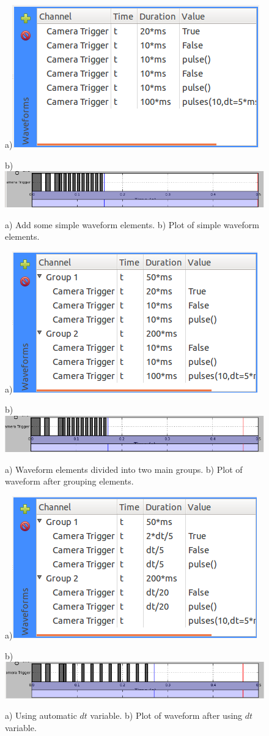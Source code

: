 \begin{enumerate}
\begin{enumerate}
        \begin{figure}[ht]
          \centerline{a)\includegraphics[width=.5\textwidth]{figures/waveform-4}}
          \centerline{b)\includegraphics[width=.8\textwidth]{figures/plot-4}}
          \caption{a) Add some simple waveform elements. b) Plot of simple
          waveform elements.}
          \label{fig:quick:waveform-4}
        \end{figure}

        \begin{figure}[ht]
          \centerline{a)\includegraphics[width=.5\textwidth]{figures/waveform-5}}
          \centerline{b)\includegraphics[width=.8\textwidth]{figures/plot-5}}
          \caption{a) Waveform elements divided into two main groups. b) Plot of
          waveform after grouping elements.}
          \label{fig:quick:waveform-5}
        \end{figure}

        \begin{figure}[ht]
          \centerline{a)\includegraphics[width=.5\textwidth]{figures/waveform-6}}
          \centerline{b)\includegraphics[width=.8\textwidth]{figures/plot-6}}
          \caption{a) Using automatic $dt$ variable. b) Plot of waveform after
          using $dt$ variable.}
          \label{fig:quick:waveform-6}
        \end{figure}



\end{enumerate}
\end{enumerate}
